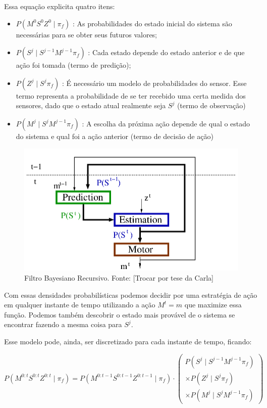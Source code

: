 Essa equação explicita quatro itens:

\begin{itemize}
  \item $ P \left( M^0 S^0 Z^0 \mid \pi_f \right) $ : As probabilidades do estado inicial do sistema são necessárias para se obter seus futuros valores;
  \item $ P \left( S^j \mid S^{j-1} M^{j-1} \pi_f \right) $ : Cada estado depende do estado anterior e de que ação foi tomada (termo de predição);
  \item $ P \left( Z^j \mid S^j \pi_f \right) $ : É necessário um modelo de probabilidades do sensor. Esse termo representa a probabilidade de se ter recebido uma certa medida dos sensores, dado que o estado atual realmente seja $ S^j $ (termo de observação)
  \item $ P \left( M^j \mid S^j M^{j-1} \pi_f \right) $ : A escolha da próxima ação depende de qual o estado do sistema e qual foi a ação anterior (termo de decisão de ação)
\end{itemize}

\begin{figure}[h]
    \centering
    \includegraphics[width=120mm]{images/modelo_bayesiano-Carla}
    \caption{\label{img:ModeloProbabilisticoCarla}Filtro Bayesiano Recursivo. Fonte: \cite{INCA2005} [Trocar por tese da Carla]}
\end{figure}

Com essas densidades probabilísticas podemos decidir por uma estratégia de ação em qualquer instante de tempo utilizando a ação $ M^t = m $ que maximize essa função. Podemos também descobrir o estado mais provável de o sistema se encontrar fazendo a mesma coisa para $ S^j $.

Esse modelo pode, ainda, ser discretizado para cada instante de tempo, ficando:

\begin{equation}
        P ( M^{0: t} S^{0: t} Z^{0: t} \mid \pi_f ) = P ( M^{0: t-1} S^{0: t-1} Z^{0: t-1} \mid \pi_f ) \cdot 
        \left(
            \begin{array}{l}
                P( S^j \mid S^{j -1} M^{j -1} \pi_f ) \\
                \times P( Z^j \mid S^j \pi_f ) \\
                \times P( M^j \mid S^j M^{j -1} \pi_f )
            \end{array}
        \right)
\end{equation}

